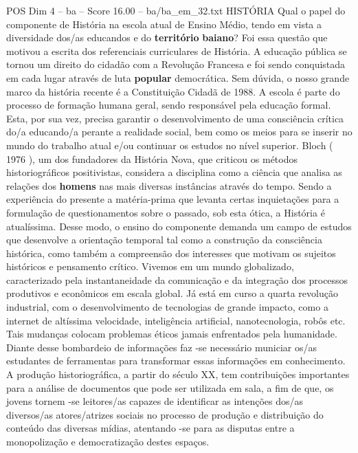\begin{textsample}{POS Dim 4 – ba – Score 16.00 – ba/ba\_em\_32.txt}  \label{ex:f4_pos_027}
HISTÓRIA Qual o papel do componente de História na escola atual de Ensino Médio, tendo em vista a diversidade dos/as educandos e do \textbf{território} \textbf{baiano}?
Foi essa questão que motivou a escrita dos referenciais curriculares de História.
A educação pública se tornou um direito do cidadão com a Revolução Francesa e foi sendo conquistada em cada lugar através de luta \textbf{popular} democrática.
Sem dúvida, o nosso grande marco da história recente é a Constituição Cidadã de 1988.
A escola é parte do processo de formação humana geral, sendo responsável pela educação formal.
Esta, por sua vez, precisa garantir o desenvolvimento de uma consciência crítica do/a educando/a perante a realidade social, bem como os meios para se inserir no mundo do trabalho atual e/ou continuar os estudos no nível superior.
Bloch ( 1976 ), um dos fundadores da História Nova, que criticou os métodos historiográficos positivistas, considera a disciplina como a ciência que analisa as relações dos \textbf{homens} nas mais diversas instâncias através do tempo.
Sendo a experiência do presente a matéria-prima que levanta certas inquietações para a formulação de questionamentos sobre o passado, sob esta ótica, a História é atualíssima.
Desse modo, o ensino do componente demanda um campo de estudos que desenvolve a orientação temporal tal como a construção da consciência histórica, como também a compreensão dos interesses que motivam os sujeitos históricos e pensamento crítico.
Vivemos em um mundo globalizado, caracterizado pela instantaneidade da comunicação e da integração dos processos produtivos e econômicos em escala global.
Já está em curso a quarta revolução industrial, com o desenvolvimento de tecnologias de grande impacto, como a internet de altíssima velocidade, inteligência artificial, nanotecnologia, robôs etc.
Tais mudanças colocam problemas éticos jamais enfrentados pela humanidade.
Diante desse bombardeio de informações faz -se necessário municiar os/as estudantes de ferramentas para transformar essas informações em conhecimento.
A produção historiográfica, a partir do século XX, tem contribuições importantes para a análise de documentos que pode ser utilizada em sala, a fim de que, os jovens tornem -se leitores/as capazes de identificar as intenções dos/as diversos/as atores/atrizes sociais no processo de produção e distribuição do conteúdo das diversas mídias, atentando -se para as disputas entre a monopolização e democratização destes espaços.

\end{textsample}
